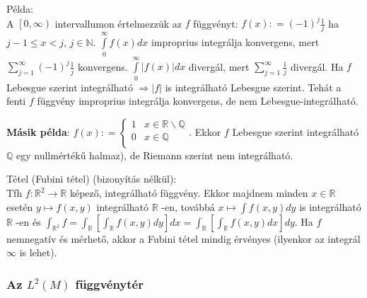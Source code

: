 \documentclass[12pt,a4paper]{scrartcl}
\newenvironment{tetel}{}{}
\newenvironment{pelda}{}{}
\begin{document}
\begin{pelda}

Példa:\\
A \(\left\lbrack {0,\infty} \right)\) intervallumon értelmezzük az \(f\)
függvényt: \(f\left( x \right): = \left( {- 1} \right)^{j}\frac{1}{j}\)
ha \(j - 1 \leq x < j\), \(j \in {\mathbb{N}}\).
\(\int\limits_{0}^{\infty}{f\left( x \right)dx}\) improprius integrálja
konvergens, mert
\(\sum\limits_{j = 1}^{\infty}{\left( {- 1} \right)^{j}\frac{1}{j}}\)
konvergens.
\(\int\limits_{0}^{\infty}{\left| {f\left( x \right)} \right|dx}\)
divergál, mert \(\sum\limits_{j = 1}^{\infty}\frac{1}{j}\) divergál. Ha
\(f\) Lebesgue szerint integrálható
\(\left. \Rightarrow\left| f \right| \right.\) is integrálható Lebesgue
szerint. Tehát a fenti \(f\) függvény improprius integrálja konvergens,
de nem Lebesgue-integrálható.

\textbf{Másik példa}:
\(f\left( x \right): = \left\{ \begin{matrix} 1 & {x \in {\mathbb{R}}\backslash{\mathbb{Q}}} \\ 0 & {x \in {\mathbb{Q}}} \\ \end{matrix} \right.\).
Ekkor \(f\) Lebesgue szerint integrálható \(\mathbb{Q}\) egy nullmértékű
halmaz), de Riemann szerint nem integrálható.

\end{pelda}

\begin{tetel}

Tétel (Fubini tétel) (bizonyítás nélkül):\\
Tfh \(\left. f:{\mathbb{R}}^{2}\rightarrow{\mathbb{R}} \right.\) képező,
integrálható függvény. Ekkor majdnem minden \(x \in {\mathbb{R}}\)
esetén \(\left. y\mapsto f\left( {x,y} \right) \right.\) integrálható
\(\mathbb{R}\) -en, továbbá
\(\left. x\mapsto{\int{f\left( {x,y} \right)dy}} \right.\) is
integrálható \(\mathbb{R}\) -en és
\({\int_{{\mathbb{R}}^{2}}f} = {\int_{\mathbb{R}}{\left\lbrack {\int_{\mathbb{R}}{f\left( {x,y} \right)dy}} \right\rbrack dx}} = {\int_{\mathbb{R}}{\left\lbrack {\int_{\mathbb{R}}{f\left( {x,y} \right)dx}} \right\rbrack dy}}\).
Ha \(f\) nemnegatív és mérhető, akkor a Fubini tétel mindig érvényes
(ilyenkor az integrál \(\infty\) is lehet).

\end{tetel}

\hypertarget{az-l2left-m-right-fuggvenyter}{%
\subsubsection{\texorpdfstring{Az \(L^{2}\left( M \right)\)
függvénytér}{Az L\^{}\{2\}\textbackslash{}left( M \textbackslash{}right) függvénytér}}\label{az-l2left-m-right-fuggvenyter}}
\end{document}
